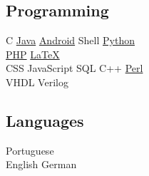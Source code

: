 \documentclass[]{willianpaixao-resume}
\begin{document}
\begin{minipage}[t]{0.35\textwidth}
\subsection{Programming}
C \textbullet
\href{https://www.oracle.com/java/}{Java} \textbullet{}
\href{http://android.com}{Android} \textbullet{}
Shell \textbullet{}
\href{http://www.python.org}{Python}\\
\href{http://www.php.net}{PHP} \textbullet{}
\href{http://www.latex-project.org}{\LaTeX}\\
CSS \textbullet{}
JavaScript \textbullet{}
SQL \textbullet{}
C++ \textbullet{}
\href{https://www.perl.org/}{Perl}\\
VHDL \textbullet{}
Verilog
\sectionsep

\subsection{Languages}
Portuguese \\
English \textbullet{}
German


\end{minipage} 
\hfill
\end{document}
